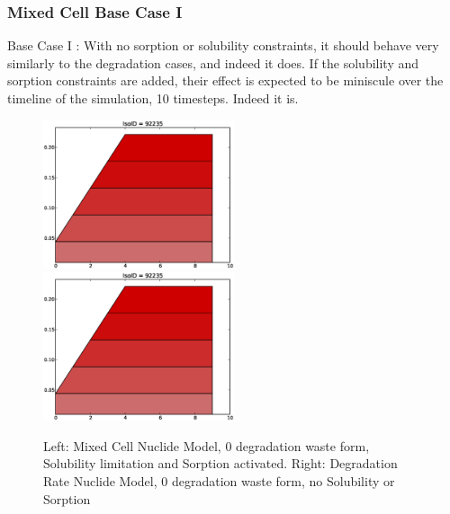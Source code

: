 \begin{frame}
  \frametitle{Mixed Cell Base Case I}
  Base Case I : With no sorption or solubility constraints, it should behave very similarly to 
  the degradation cases, and indeed it does. If the solubility and sorption 
  constraints are added, their effect is expected to be miniscule over the 
  timeline of the simulation, 10 timesteps. Indeed it is. 

  \begin{figure}[htbp!]
    \begin{center}
     \includegraphics[width=0.5\textwidth]{cyder/images/mixed_0deg.eps}
     \includegraphics[width=0.5\textwidth]{cyder/images/0deg.eps}
     \caption{Left: Mixed Cell Nuclide Model, 0 degradation waste form, Solubility 
     limitation and Sorption activated. Right: Degradation Rate Nuclide Model, 0 degradation waste form, no 
     Solubility or Sorption}
    \end{center}
  \end{figure}
\end{frame}

